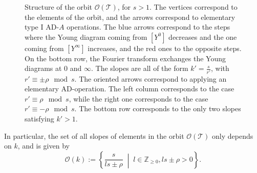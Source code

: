 \documentclass[11pt,a4paper]{amsart}
\numberwithin{equation}{section}
\begin{document}
\begin{theorem}
\begin{figure}[h]
\caption{Structure of the orbit $\mathcal O(\mathcal T)$, for $s>1$. The vertices correspond to the elements of the orbit, and the arrows correspond to elementary type I AD-$A$ operations. The blue arrows correspond to the steps where the Young diagram coming from $[Y^0]$ decreases and the one coming from $[Y^\infty]$ increases, and the red ones to the opposite steps.  On the bottom row, the Fourier transform exchanges the Young diagrams at 0 and $\infty$.  The slopes are all of the form $k'=\frac{s}{r'}$, with $r'\equiv \pm \rho \mod s$. The oriented arrows correspond to applying an elementary AD-operation. The left column corresponds to the case $r'\equiv \rho \mod s$, while the right one corresponds to the case $r'\equiv -\rho \mod s$. The bottom row corresponds to the only two slopes satisfying $k'>1$.}
\label{fig:structure_orbit}
\end{figure}


In particular, the set of all slopes of elements in the orbit $\mathcal O(\mathcal T)$ only depends on $k$, and is given by
\begin{equation}
\label{eq:form_slopes_orbit}
\mathcal O(k):=\left\lbrace \frac{s}{ls\pm \rho} \;\middle \vert\; l\in \mathbb Z_{\geq 0}, ls\pm \rho>0 \right\rbrace.
\end{equation}


\end{theorem}
\end{document}
